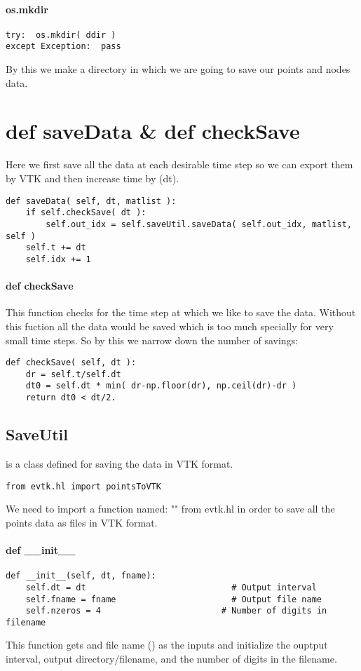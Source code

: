 \paragraph{os.mkdir}
\begin{lstlisting}
try:  os.mkdir( ddir )	    
except Exception:  pass
\end{lstlisting}
By this we make a directory in which we are going to save our points and nodes data. 

\section{def saveData \& def checkSave}
Here we first save all the data at each desirable time step so we can export them by VTK and then increase time by (dt).

\begin{lstlisting}
def saveData( self, dt, matlist ):
	if self.checkSave( dt ):
	    self.out_idx = self.saveUtil.saveData( self.out_idx, matlist, self )
	self.t += dt
	self.idx += 1
\end{lstlisting}
\paragraph{def checkSave}
This function checks for the time step at which we like to save the data. Without this fuction all the data would be saved which is too much specially for very small time steps. So by this we narrow down the number of savings:
\begin{lstlisting}
def checkSave( self, dt ):
	dr = self.t/self.dt
	dt0 = self.dt * min( dr-np.floor(dr), np.ceil(dr)-dr )
	return dt0 < dt/2.
\end{lstlisting}
\subsection{SaveUtil}
 is a class defined for saving the data in VTK format.
\begin{lstlisting}
from evtk.hl import pointsToVTK
\end{lstlisting}
We need to import a function named: "" from evtk.hl in order to save all the points data as files in VTK format.
\paragraph{def \_\_init\_\_}
\begin{lstlisting}
def __init__(self, dt, fname):
	self.dt = dt                             # Output interval
	self.fname = fname                       # Output file name
	self.nzeros = 4                        # Number of digits in filename
\end{lstlisting}
This function gets  and file name () as the inputs and initialize the ouptput interval, output directory/filename, and the number of digits in the filename.
